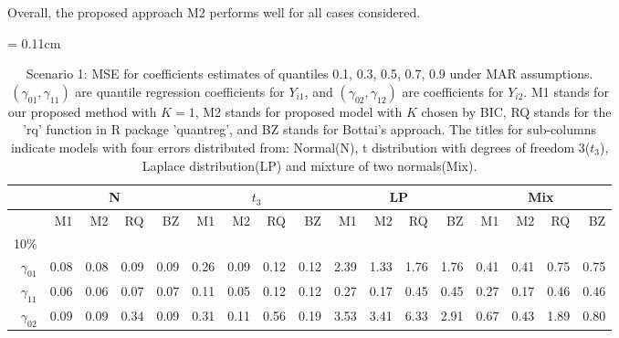 \documentclass[12pt]{article}
\begin{document}
Overall, the proposed approach M2 performs well for all cases considered.



  \begin{table}
\centering
    \caption{Scenario 1: MSE for coefficients estimates of quantiles 0.1, 0.3, 0.5, 0.7, 0.9 under MAR assumptions.
$(\gamma_{01}, \gamma_{11})$ are quantile regression coefficients for $Y_{i1}$, and $(\gamma_{02}, \gamma_{12})$ are coefficients for $Y_{i2}$. M1 stands for our proposed method with $K = 1$, M2 stands for proposed model with $K$ chosen by BIC, RQ stands for the 'rq' function in R package 'quantreg', and BZ stands for Bottai's approach.
The titles for sub-columns indicate models with four errors distributed from: Normal(N), t distribution with degrees of freedom 3($t_3$),
Laplace distribution(LP) and mixture of two normals(Mix).
}\label{tab:simh2}
    \vspace{10pt} \tabcolsep = 0.11cm
    \begin{tabular}{r|rrrr|rrrr|rrrr|rrrr}
      \hline
              & \multicolumn{4}{c|}{N} & \multicolumn{4}{c|}{$t_3$}   & \multicolumn{4}{c|}{LP}   & \multicolumn{4}{c}{Mix}   \\
      \hline
           & M1                      & M2 & RQ & BZ   & M1                      & M2 & RQ & BZ   & M1                      & M2 & RQ & BZ   & M1                      & M2 & RQ & BZ \\
10\%  &&&&&&&&&&&&&&&\\
$\gamma_{01}$ & 0.08 & 0.08 & 0.09 & 0.09 & 0.26 & 0.09 & 0.12 & 0.12 & 2.39 & 1.33 & 1.76 & 1.76 & 0.41 & 0.41 & 0.75 & 0.75 \\
$\gamma_{11}$ & 0.06 & 0.06 & 0.07 & 0.07 & 0.11 & 0.05 & 0.12 & 0.12 & 0.27 & 0.17 & 0.45 & 0.45 & 0.27 & 0.17 & 0.46 & 0.46 \\
$\gamma_{02}$ & 0.09 & 0.09 & 0.34 & 0.09 & 0.31 & 0.11 & 0.56 & 0.19 & 3.53 & 3.41 & 6.33 & 2.91 & 0.67 & 0.43 & 1.89 & 0.80 \\

\end{tabular}
\end{table}
\end{document}
